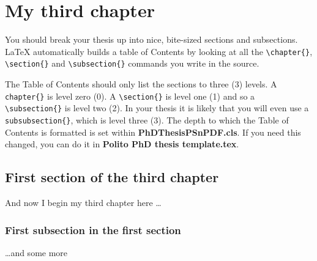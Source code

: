 \chapter{My third chapter}

\ifpdf
    \graphicspath{{Chapter3/Figs/}{Chapter3/Figs/PDF/}{Chapter3/Figs/}}
\else
    \graphicspath{{Chapter3/Figs/Vector/}{Chapter3/Figs/}}
\fi
You should break your thesis up into nice, bite-sized sections and subsections. \LaTeX{} automatically builds a table of Contents by looking at all the \verb|\chapter{}|, \verb|\section{}|  and \verb|\subsection{}| commands you write in the source.

The Table of Contents should only list the sections to three (3) levels. A \verb|chapter{}| is level zero (0). A \verb|\section{}| is level one (1) and so a \verb|\subsection{}| is level two (2). In your thesis it is likely that you will even use a \verb|subsubsection{}|, which is level three (3). The depth to which the Table of Contents is formatted is set within \textbf{PhDThesisPSnPDF.cls}. If you need this changed, you can do it in \textbf{Polito PhD thesis template.tex}. 

\section{First section of the third chapter}
And now I begin my third chapter here \dots


\subsection{First subsection in the first section}
\dots and some more 

